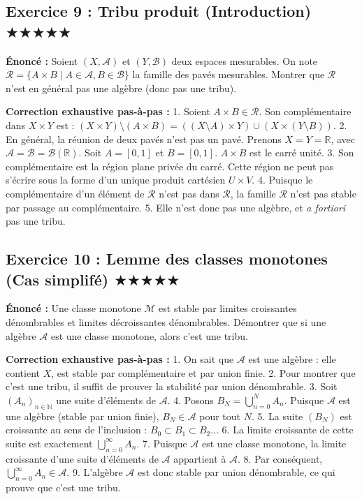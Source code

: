 \documentclass[11pt,a4paper]{article}
\begin{document}
\subsection*{Exercice 9 : Tribu produit (Introduction) \quad $\bigstar\bigstar\bigstar\bigstar\bigstar$}


\textbf{Énoncé :}
Soient $(X, \mathcal{A})$ et $(Y, \mathcal{B})$ deux espaces mesurables. On note $\mathcal{R} = \{A \times B \mid A \in \mathcal{A}, B \in \mathcal{B}\}$ la famille des pavés mesurables. Montrer que $\mathcal{R}$ n'est en général pas une algèbre (donc pas une tribu).

\textbf{Correction exhaustive pas-à-pas :}
1. Soient $A \times B \in \mathcal{R}$. Son complémentaire dans $X \times Y$ est :
   $(X \times Y) \setminus (A \times B) = ((X \setminus A) \times Y) \cup (X \times (Y \setminus B))$.
2. En général, la réunion de deux pavés n'est pas un pavé. Prenons $X = Y = \mathbb{R}$, avec $\mathcal{A} = \mathcal{B} = \mathcal{B}(\mathbb{R})$.
   Soit $A = [0, 1]$ et $B = [0, 1]$. $A \times B$ est le carré unité.
3. Son complémentaire est la région plane privée du carré. Cette région ne peut pas s'écrire sous la forme d'un unique produit cartésien $U \times V$.
4. Puisque le complémentaire d'un élément de $\mathcal{R}$ n'est pas dans $\mathcal{R}$, la famille $\mathcal{R}$ n'est pas stable par passage au complémentaire.
5. Elle n'est donc pas une algèbre, et \textit{a fortiori} pas une tribu.



\subsection*{Exercice 10 : Lemme des classes monotones (Cas simplifé) \quad $\bigstar\bigstar\bigstar\bigstar\bigstar$}


\textbf{Énoncé :}
Une classe monotone $\mathcal{M}$ est stable par limites croissantes dénombrables et limites décroissantes dénombrables. Démontrer que si une algèbre $\mathcal{A}$ est une classe monotone, alors c'est une tribu.

\textbf{Correction exhaustive pas-à-pas :}
1. On sait que $\mathcal{A}$ est une algèbre : elle contient $X$, est stable par complémentaire et par union finie.
2. Pour montrer que c'est une tribu, il suffit de prouver la stabilité par union dénombrable.
3. Soit $(A_n)_{n \in \mathbb{N}}$ une suite d'éléments de $\mathcal{A}$.
4. Posons $B_N = \bigcup_{n=0}^N A_n$. Puisque $\mathcal{A}$ est une algèbre (stable par union finie), $B_N \in \mathcal{A}$ pour tout $N$.
5. La suite $(B_N)$ est croissante au sens de l'inclusion : $B_0 \subset B_1 \subset B_2 \dots$
6. La limite croissante de cette suite est exactement $\bigcup_{n=0}^{\infty} A_n$.
7. Puisque $\mathcal{A}$ est une classe monotone, la limite croissante d'une suite d'éléments de $\mathcal{A}$ appartient à $\mathcal{A}$.
8. Par conséquent, $\bigcup_{n=0}^{\infty} A_n \in \mathcal{A}$.
9. L'algèbre $\mathcal{A}$ est donc stable par union dénombrable, ce qui prouve que c'est une tribu.
\end{document}
